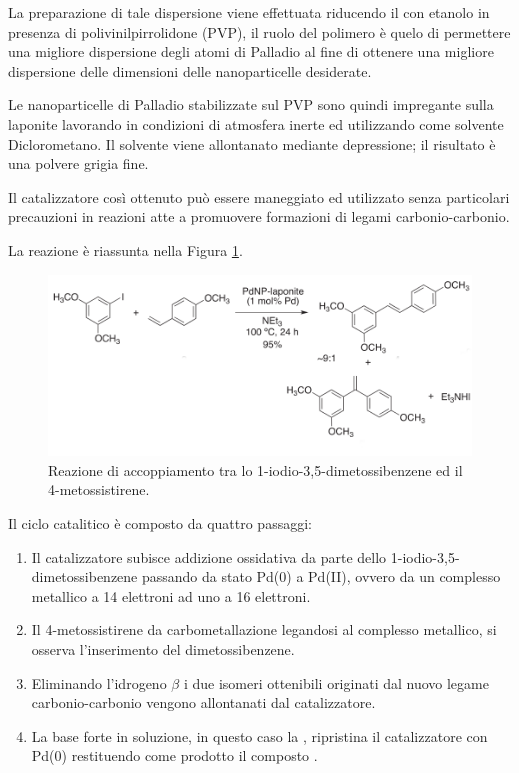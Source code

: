 \documentclass[a4paper, 12pt]{article}
\begin{document}
La preparazione di tale dispersione viene effettuata riducendo il  con etanolo in presenza di polivinilpirrolidone (PVP), il ruolo del polimero è quelo di permettere una migliore dispersione degli atomi di Palladio al fine di ottenere una migliore dispersione delle dimensioni delle nanoparticelle desiderate.

Le nanoparticelle di Palladio stabilizzate sul PVP sono quindi impregante sulla laponite lavorando in condizioni di atmosfera inerte ed utilizzando come solvente Diclorometano. Il solvente viene allontanato mediante depressione; il risultato è una polvere grigia fine.\cite{martinez_extremely_2015}

Il catalizzatore così ottenuto può essere maneggiato ed utilizzato senza particolari precauzioni in reazioni atte a promuovere formazioni di legami carbonio-carbonio.

La reazione è riassunta nella Figura \ref{fig:h-m_resveratrolo}.

\begin{figure}[H]
	\centering
	\includegraphics[width=\linewidth]{immagini/h-m_resveratrolo.png}
	\caption{Reazione di accoppiamento tra lo 1-iodio-3,5-dimetossibenzene ed il 4-metossistirene.}
	\label{fig:h-m_resveratrolo}
\end{figure}

Il ciclo catalitico è composto da quattro passaggi:
\begin{enumerate}
	\item Il catalizzatore  subisce addizione ossidativa da parte dello 1-iodio-3,5-dimetossibenzene passando da stato Pd(0) a Pd(II), ovvero da un complesso metallico a 14 elettroni ad uno a 16 elettroni.
	\item Il 4-metossistirene da carbometallazione legandosi al complesso metallico, si osserva l'inserimento del dimetossibenzene.
	\item Eliminando l'idrogeno $\beta$ i due isomeri ottenibili originati dal nuovo legame carbonio-carbonio vengono allontanati dal catalizzatore.
	\item La base forte in soluzione, in questo caso la , ripristina il catalizzatore con Pd(0) restituendo come prodotto il composto .
\end{enumerate}
\end{document}
